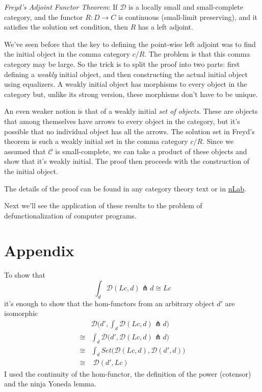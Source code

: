 \documentclass[11pt]{amsart}
\begin{document}
\emph{Freyd's Adjoint Functor Theorem}: If $\mathcal D$ is a locally small and small-complete category, and the functor $R \colon D \to C$ is continuous (small-limit preserving), and it satisfies the solution set condition, then $R$ has a left adjoint.

We've seen before that the key to defining the point-wise left adjoint was to find the initial object in the comma category $c/R$. The problem is that this comma category may be large. So the trick is to split the proof into two parts: first defining a \emph{weakly} initial object, and then constructing the actual initial object using equalizers. A weakly initial object has morphisms to every object in the category but, unlike its strong version, these morphisms don't have to be unique. 

An even weaker notion is that of a weakly initial \emph{set of objects}. These are objects that among themselves have arrows to every object in the category, but it's possible that no individual object has all the arrows. The solution set in Freyd's theorem is such a weakly initial set in the comma category $c/R$. Since we assumed that $\mathcal C$ is small-complete, we can take a product of these objects and show that it's weakly initial. The proof then proceeds with the construction of the initial object. 

The details of the proof can be found in any category theory text or in \href{https://ncatlab.org/nlab/show/adjoint+functor+theorem}{nLab}. 

Next we'll see the application of these results to the problem of defunctionalization of computer programs.

\section{Appendix}
To show that
\[\int_d \mathcal{D}(L c, d) \pitchfork d \cong L c\]
it's enough to show that the hom-functors from an arbitrary object $d'$ are isomorphic
\[\begin{aligned}
& \mathcal{D}\big(d', \int_d \mathcal{D}(L c, d) \pitchfork d\big) \\
\cong & \int_d \mathcal{D}\big(d',  \mathcal{D}(L c, d) \pitchfork d\big) \\
\cong & \int_d Set\big( \mathcal{D}(L c, d),  \mathcal{D}(d', d) \big) \\
\cong & \; \mathcal{D}(d', L c)
\end{aligned} 
\]
I used the continuity of the hom-functor, the definition of the power (cotensor) and the ninja Yoneda lemma.
\end{document}
